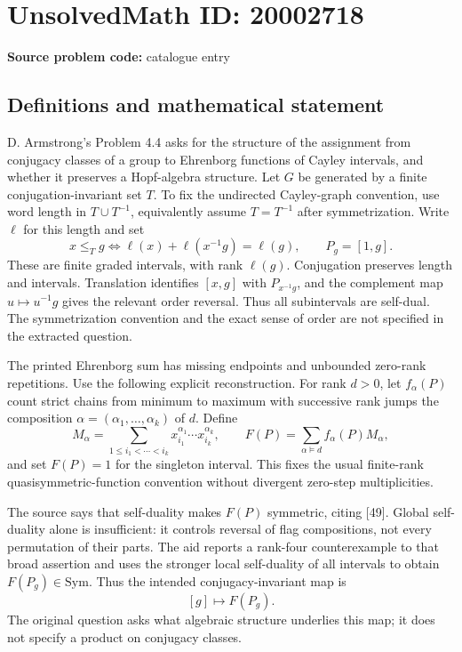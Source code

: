 \documentclass[11pt]{article}
\begin{document}
\section*{UnsolvedMath ID: 20002718}
\textbf{Source problem code:} catalogue entry
\subsection{Definitions and mathematical statement}
D. Armstrong's Problem 4.4 asks for the structure of the assignment from conjugacy classes of a group to Ehrenborg functions of Cayley intervals, and whether it preserves a Hopf-algebra structure. Let \(G\) be generated by a finite conjugation-invariant set \(T\). To fix the undirected Cayley-graph convention, use word length in \(T\cup T^{-1}\), equivalently assume \(T=T^{-1}\) after symmetrization. Write \(\ell\) for this length and set
\[
 x\le_Tg\iff\ell(x)+\ell(x^{-1}g)=\ell(g),\qquad
 P_g=[1,g].
\]
These are finite graded intervals, with rank \(\ell(g)\). Conjugation preserves length and intervals. Translation identifies \([x,g]\) with \(P_{x^{-1}g}\), and the complement map \(u\mapsto u^{-1}g\) gives the relevant order reversal. Thus all subintervals are self-dual. The symmetrization convention and the exact sense of order are not specified in the extracted question.

The printed Ehrenborg sum has missing endpoints and unbounded zero-rank repetitions. Use the following explicit reconstruction. For rank \(d>0\), let \(f_\alpha(P)\) count strict chains from minimum to maximum with successive rank jumps the composition \(\alpha=(\alpha_1,\ldots,\alpha_k)\) of \(d\). Define
\[
 M_\alpha=\sum_{1\le i_1<\cdots<i_k}
       x_{i_1}^{\alpha_1}\cdots x_{i_k}^{\alpha_k},\qquad
 F(P)=\sum_{\alpha\vDash d}f_\alpha(P)M_\alpha,
\]
and set \(F(P)=1\) for the singleton interval. This fixes the usual finite-rank quasisymmetric-function convention without divergent zero-step multiplicities.

The source says that self-duality makes \(F(P)\) symmetric, citing [49]. Global self-duality alone is insufficient: it controls reversal of flag compositions, not every permutation of their parts. The aid reports a rank-four counterexample to that broad assertion and uses the stronger local self-duality of all intervals to obtain \(F(P_g)\in\mathrm{Sym}\). Thus the intended conjugacy-invariant map is
\[
 [g]\longmapsto F(P_g).
\]
The original question asks what algebraic structure underlies this map; it does not specify a product on conjugacy classes.
\end{document}

